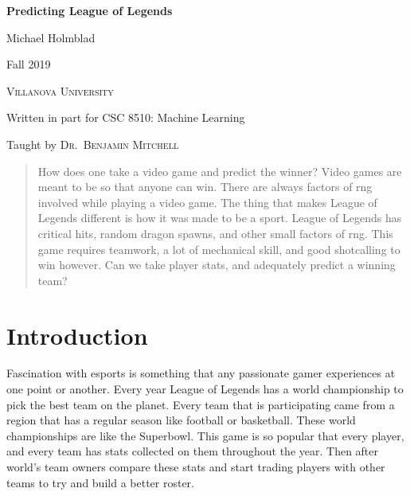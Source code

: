 \documentclass[11pt]{article}
\theoremstyle{plain}
\theoremstyle{definition}
\numberwithin{equation}{section}
\numberwithin{theorem}{section}
\numberwithin{lemma}{section}
\numberwithin{definition}{section}
\numberwithin{proposition}{section}
\numberwithin{corollary}{section}
\begin{document}
\begin{titlepage}
    \thispagestyle{empty}
	\centering
	{\Huge\bfseries Predicting League of Legends \par}
    \vspace{1in}
	{\LARGE Michael Holmblad \par}
	\vspace{0.5in}
	
	
    {\Large Fall 2019 \par}
	\vfill
    {\scshape\Large Villanova University \par}
	\vspace{0.25in}
	{\scshape\large   \par}
	\vspace{0.25in}


	Written in part for CSC 8510: Machine Learning \par
    Taught by \textsc{Dr.~Benjamin Mitchell}\par


\end{titlepage}

\newpage
\tableofcontents
{}

\newpage

	
\begin{abstract}
    How does one take a video game and predict the winner? Video games are meant to be so that anyone can win. There are always factors of rng involved while playing a video game. The thing that makes League of Legends different is how it was made to be a sport. League of Legends has critical hits, random dragon spawns, and other small factors of rng. This game requires teamwork, a lot of mechanical skill, and good shotcalling to win however. Can we take player stats, and adequately predict a winning team?
\end{abstract}

\section{Introduction}
	Fascination with esports is something that any passionate gamer experiences at one point or another. Every year League of Legends has a world championship to pick the best team on the planet. Every team that is participating came from a region that has a regular season like football or basketball. These world championships are like the Superbowl. This game is so popular that every player, and every team has stats collected on them throughout the year. Then after world's team owners compare these stats and start trading players with other teams to try and build a better roster.
	
\end{document}
